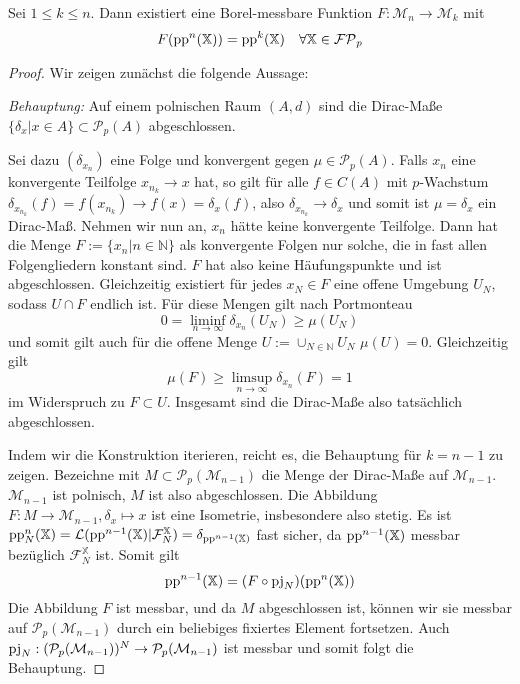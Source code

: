     \begin{lemma}\label{thm:stepback_pp}
        Sei $1\leq k\leq n$. Dann existiert eine Borel-messbare Funktion $F:\mathcal{M}_n\rightarrow \mathcal{M}_k$ mit 
        $$F(\operatorname{pp}^n(\mathbb{X})) = \operatorname{pp}^k(\mathbb{X}) \quad \forall \mathbb{X} \in \mathcal{FP}_p$$
    \end{lemma}
    \begin{proof}
        Wir zeigen zunächst die folgende Aussage:

        \emph{Behauptung:} Auf einem polnischen Raum $(A, d)$ sind die Dirac-Maße $\{\delta_x \vert x\in A\} \subset \mathcal{P}_p(A)$ abgeschlossen.

        Sei dazu $\left(\delta_{x_n}\right)$ eine Folge und konvergent gegen $\mu \in \mathcal{P}_p(A)$. Falls $x_n$ eine konvergente Teilfolge $x_{n_k} \rightarrow x$ hat, so gilt für alle $f \in C(A)$ mit $p$-Wachstum $\delta_{x_{n_k}}(f)=f(x_{n_k})\rightarrow f(x)=\delta_x(f)$, also $\delta_{x_{n_k}}\rightarrow \delta_x$ und somit ist $\mu = \delta_x$ ein Dirac-Maß. Nehmen wir nun an, $x_n$ hätte keine konvergente Teilfolge. Dann hat die Menge $F:=\{x_n \vert n \in \mathbb{N}\}$ als konvergente Folgen nur solche, die in fast allen Folgengliedern konstant sind. $F$ hat also keine Häufungspunkte und ist abgeschlossen. Gleichzeitig existiert für jedes $x_N \in F$ eine offene Umgebung $U_N$, sodass $U\cap F$ endlich ist. Für diese Mengen gilt nach Portmonteau
        $$0 = \liminf_{n\rightarrow \infty} \delta_{x_n}(U_N) \geq \mu(U_N)$$
        und somit gilt auch für die offene Menge $U:=\cup_{N\in\mathbb{N}} U_N$ $\mu(U)=0$. Gleichzeitig gilt
        $$\mu(F) \geq \limsup_{n\rightarrow \infty} \delta_{x_n}(F)=1$$
        im Widerspruch zu $F \subset U$. Insgesamt sind die Dirac-Maße also tatsächlich abgeschlossen.

        Indem wir die Konstruktion iterieren, reicht es, die Behauptung für $k=n-1$ zu zeigen. Bezeichne mit $M\subset \mathcal{P}_p(\mathcal{M}_{n-1})$ die Menge der Dirac-Maße auf $\mathcal{M}_{n-1}$. $\mathcal{M}_{n-1}$ ist polnisch, $M$ ist also abgeschlossen. Die Abbildung $F: M \rightarrow \mathcal{M}_{n-1}, \delta_x \mapsto x$ ist eine Isometrie, insbesondere also stetig. Es ist $\operatorname{pp}^n_N(\mathbb{X}) = \mathcal{L}(\operatorname{pp}^{n-1}(\mathbb{X})\vert \mathcal{F}_N^\mathbb{X}) = \delta_{\operatorname{pp}^{n-1}(\mathbb{X})}$ fast sicher, da $\operatorname{pp}^{n-1}(\mathbb{X})$ messbar bezüglich $\mathcal{F}_N^{\mathbb{X}}$ ist. Somit gilt 
        $$\operatorname{pp}^{n-1}(\mathbb{X}) = (F\circ \operatorname{pj}_N)(\operatorname{pp}^n(\mathbb{X}))$$
        Die Abbildung $F$ ist messbar, und da $M$ abgeschlossen ist, können wir sie messbar auf $\mathcal{P}_p(\mathcal{M}_{n-1})$ durch ein beliebiges fixiertes Element fortsetzen. Auch $\operatorname{pj}_N:(\mathcal{P}_p(\mathcal{M}_{n-1}))^N \rightarrow \mathcal{P}_p(\mathcal{M}_{n-1})$ ist messbar und somit folgt die Behauptung.
    \end{proof}
